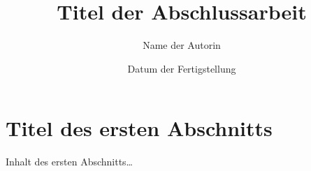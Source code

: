 \documentclass[language=de,degree=bachelor]{mfithesis} %
\begin{document}
\author{Name der Autorin}
\title{Titel der Abschlussarbeit}


\date{Datum der Fertigstellung}




\maketitle %
\tableofcontents %


\section{Titel des ersten Abschnitts}
Inhalt des ersten Abschnitts\ldots





\newpage
\declaration
\end{document}
